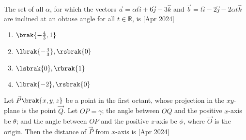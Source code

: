 \iffalse
  \title{Assignment}
  \author{EE24BTECH11044}
  \section{mcq-single}
\fi

	\item The set of all $\alpha$, for which the vectors $\vec{a}=\alpha t\hat{i}+6\hat{j}-3\hat{k}$ and $\vec{b}=t\hat{i}-2\hat{j}-2\alpha t\hat{k}$ are inclined at an obtuse angle for all $t\in\mathbb{R}$, is \hfill{[Apr 2024]}
		\begin{enumerate}
			\item $\brak{-\frac{4}{3},1}$\\
			\item $\lbrak{-\frac{4}{3}},\rsbrak{0}$\\
			\item $\lsbrak{0},\rbrak{1}$\\
			\item $\lbrak{-2},\rsbrak{0}$\\
		\end{enumerate}
	\item Let $\vec{P}\brak{x,y,z}$ be a point in the first octant, whose projection in the $xy$-plane is the point $\vec{Q}$. Let $OP=\gamma$; the angle between $OQ$ and the positive $x$-axis be $\theta$; and the angle between $OP$ and the positive $z$-axis be $\phi$, where $\vec{O}$ is the origin. Then the distance of $\vec{P}$ from $x$-axis is  \hfill{[Apr 2024]}

